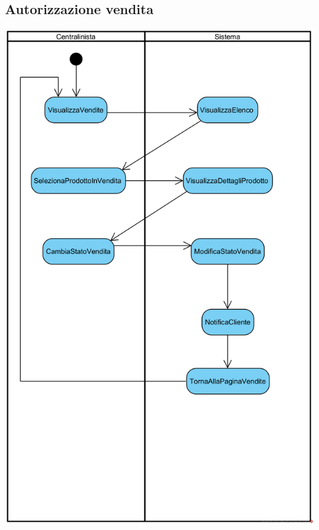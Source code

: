 \documentclass[12pt,a4paper]{article}
\begin{document}
\subsection{Autorizzazione vendita}
\begin{center}
\includegraphics[scale=1.3]{ActivityDiagram/CentralinistaAutorizzazioneVendita}
\end{center}
\end{document}
